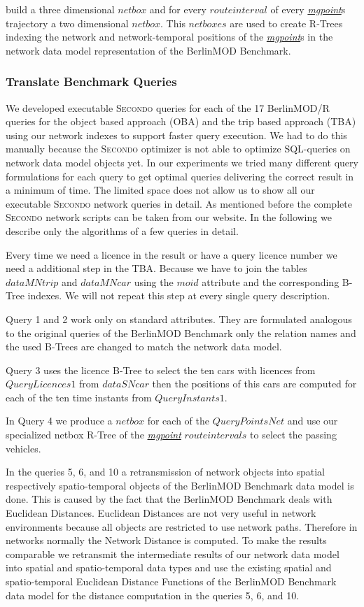\documentclass[a4paper]{article}
\newcommand{\secondo}{\textsc{Secondo}}
\newcommand{\bmodb} {BerlinMOD Benchmark}
\newcommand{\dt}[1]{\textsl{\underline{#1}}}
\begin{document}
build a three dimensional $netbox$ and for every $route interval$ of every
\dt{mgpoint}s trajectory a two dimensional $netbox$. This $netboxes$ are used to
create R-Trees indexing the network and network-temporal positions of the \dt{mgpoint}s
in the network data model representation of the \bmodb{}.
\subsubsection{Translate Benchmark Queries}
\label{sec:queries}
We developed executable \secondo{} queries for each of the 17 BerlinMOD/R queries
for the object based approach (OBA) and the trip based approach (TBA) using our
network indexes to support faster query execution. We had to do this manually
because the \secondo{} optimizer is not able to optimize SQL-queries on network
data model objects yet. In our experiments we tried many different query
formulations for each query to get optimal queries delivering the correct result
in a minimum of time. The limited space does not allow us to show all our
executable \secondo{} network queries in detail. As mentioned before the complete
\secondo{} network scripts can be taken from our website. In the following we
describe only the algorithms of a few queries in detail.

Every time we need a licence in the result or have a query licence number we need
a additional step in the TBA. Because we have to join the tables
$dataMNtrip$ and $dataMNcar$ using the $moid$ attribute and the corresponding
B-Tree indexes. We will not repeat this step at every single
query description.

Query 1 and 2 work only on standard attributes. They are formulated analogous to
the original queries of the \bmodb{} only the relation names and the used B-Trees
are changed to match the network data model.

Query 3 uses the licence B-Tree to select the ten cars with licences from
$QueryLicences1$ from $dataSNcar$ then the positions of this cars are computed
for each of the ten time instants from $QueryInstants1$.

In Query 4 we produce a $netbox$ for each of the $QueryPointsNet$ and use our
specialized netbox R-Tree of the \dt{mgpoint} $route intervals$ to select
the passing vehicles.

In the queries 5, 6, and 10 a retransmission of network objects into spatial
respectively spatio-temporal objects of the \bmodb{} data model is done. This is
caused by the fact that
the \bmodb{} deals with Euclidean Distances. Euclidean Distances are not very useful
in network environments because all objects are restricted to use network paths.
Therefore in networks normally the Network Distance is computed. To make the results
comparable we retransmit the intermediate results of our network data model into
spatial and spatio-temporal data types and use the existing spatial and
spatio-temporal Euclidean Distance Functions of the \bmodb{} data model for the
distance computation in the queries 5, 6, and 10.
\end{document}
